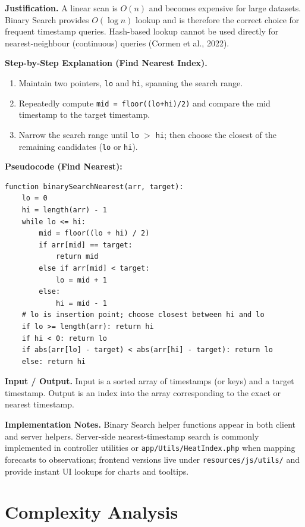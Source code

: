 \documentclass[12pt]{article}
\begin{document}
\noindent\textbf{Justification.} A linear scan is $O(n)$ and becomes expensive for large datasets. Binary Search provides $O(\log n)$ lookup and is therefore the correct choice for frequent timestamp queries. Hash-based lookup cannot be used directly for nearest-neighbour (continuous) queries (Cormen et al., 2022).

\noindent\textbf{Step-by-Step Explanation (Find Nearest Index).}
\begin{enumerate}
    \item Maintain two pointers, \texttt{lo} and \texttt{hi}, spanning the search range.
    \item Repeatedly compute \texttt{mid = floor((lo+hi)/2)} and compare the mid timestamp to the target timestamp.
    \item Narrow the search range until \texttt{lo} $>$ \texttt{hi}; then choose the closest of the remaining candidates (\texttt{lo} or \texttt{hi}).
\end{enumerate}

\noindent\textbf{Pseudocode (Find Nearest):}
\begin{lstlisting}[language=Pseudocode, caption={Binary Search for nearest timestamp}]
function binarySearchNearest(arr, target):
    lo = 0
    hi = length(arr) - 1
    while lo <= hi:
        mid = floor((lo + hi) / 2)
        if arr[mid] == target:
            return mid
        else if arr[mid] < target:
            lo = mid + 1
        else:
            hi = mid - 1
    # lo is insertion point; choose closest between hi and lo
    if lo >= length(arr): return hi
    if hi < 0: return lo
    if abs(arr[lo] - target) < abs(arr[hi] - target): return lo
    else: return hi
\end{lstlisting}

\noindent\textbf{Input / Output.} Input is a sorted array of timestamps (or keys) and a target timestamp. Output is an index into the array corresponding to the exact or nearest timestamp.

\noindent\textbf{Implementation Notes.} Binary Search helper functions appear in both client and server helpers. Server-side nearest-timestamp search is commonly implemented in controller utilities or \texttt{app/Utils/HeatIndex.php} when mapping forecasts to observations; frontend versions live under \texttt{resources/js/utils/} and provide instant UI lookups for charts and tooltips.

\section{Complexity Analysis}
\end{document}
